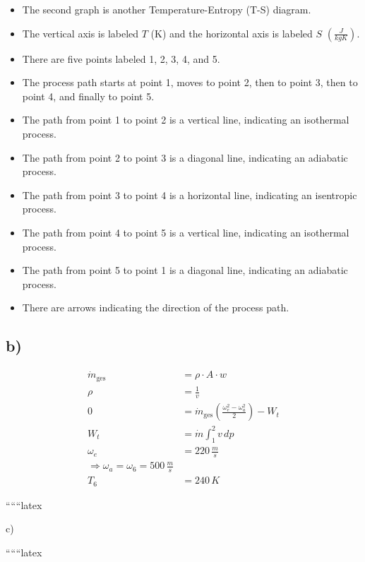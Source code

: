 \begin{itemize}
    \item The second graph is another Temperature-Entropy (T-S) diagram.
    \item The vertical axis is labeled \( T \) (K) and the horizontal axis is labeled \( S \) \(\left(\frac{J}{kgK}\right)\).
    \item There are five points labeled 1, 2, 3, 4, and 5.
    \item The process path starts at point 1, moves to point 2, then to point 3, then to point 4, and finally to point 5.
    \item The path from point 1 to point 2 is a vertical line, indicating an isothermal process.
    \item The path from point 2 to point 3 is a diagonal line, indicating an adiabatic process.
    \item The path from point 3 to point 4 is a horizontal line, indicating an isentropic process.
    \item The path from point 4 to point 5 is a vertical line, indicating an isothermal process.
    \item The path from point 5 to point 1 is a diagonal line, indicating an adiabatic process.
    \item There are arrows indicating the direction of the process path.
\end{itemize}

\subsection*{b)}

\begin{align*}
    \dot{m}_{\text{ges}} &= \rho \cdot A \cdot w \\
    \rho &= \frac{1}{v} \\
    0 &= \dot{m}_{\text{ges}} \left( \frac{\omega_e^2 - \omega_a^2}{2} \right) - W_t \\
    W_t &= \dot{m} \int_{1}^{2} v \, dp \\
    \omega_e &= 220 \, \frac{m}{s} \\
    \Rightarrow \omega_a = \omega_6 = 500 \, \frac{m}{s} \\
    T_6 &= 240 \, K
\end{align*}

``````latex


c)

``````latex



